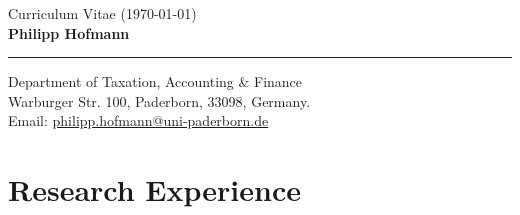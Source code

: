 \documentclass[11pt, a4paper]{article}
\begin{document}
\hfill {\footnotesize Curriculum Vitae (\today)} \\[5pt]

{\huge \textbf{Philipp Hofmann}} \\[2pt]

\hrule 
\vspace{8pt}

Department of Taxation, Accounting \& Finance \\
Warburger Str. 100, Paderborn, 33098, Germany. \\
Email: \href{mailto:philipp.hofmann@uni-paderborn.de}{philipp.hofmann@uni-paderborn.de}

\vspace{10pt}

\section*{Research Experience}
\end{document}
